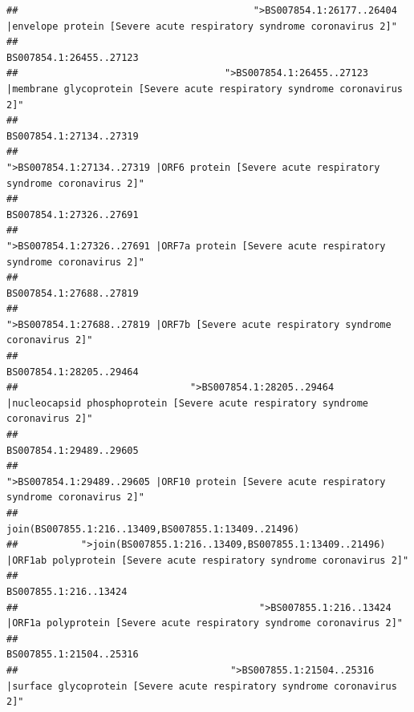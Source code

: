 \documentclass[
]{article}
\begin{document}
\begin{verbatim}
##                                         ">BS007854.1:26177..26404 |envelope protein [Severe acute respiratory syndrome coronavirus 2]" 
##                                                                                                                BS007854.1:26455..27123 
##                                    ">BS007854.1:26455..27123 |membrane glycoprotein [Severe acute respiratory syndrome coronavirus 2]" 
##                                                                                                                BS007854.1:27134..27319 
##                                             ">BS007854.1:27134..27319 |ORF6 protein [Severe acute respiratory syndrome coronavirus 2]" 
##                                                                                                                BS007854.1:27326..27691 
##                                            ">BS007854.1:27326..27691 |ORF7a protein [Severe acute respiratory syndrome coronavirus 2]" 
##                                                                                                                BS007854.1:27688..27819 
##                                                    ">BS007854.1:27688..27819 |ORF7b [Severe acute respiratory syndrome coronavirus 2]" 
##                                                                                                                BS007854.1:28205..29464 
##                              ">BS007854.1:28205..29464 |nucleocapsid phosphoprotein [Severe acute respiratory syndrome coronavirus 2]" 
##                                                                                                                BS007854.1:29489..29605 
##                                            ">BS007854.1:29489..29605 |ORF10 protein [Severe acute respiratory syndrome coronavirus 2]" 
##                                                                                    join(BS007855.1:216..13409,BS007855.1:13409..21496) 
##           ">join(BS007855.1:216..13409,BS007855.1:13409..21496) |ORF1ab polyprotein [Severe acute respiratory syndrome coronavirus 2]" 
##                                                                                                                  BS007855.1:216..13424 
##                                          ">BS007855.1:216..13424 |ORF1a polyprotein [Severe acute respiratory syndrome coronavirus 2]" 
##                                                                                                                BS007855.1:21504..25316 
##                                     ">BS007855.1:21504..25316 |surface glycoprotein [Severe acute respiratory syndrome coronavirus 2]" 

\end{verbatim}
\end{document}

